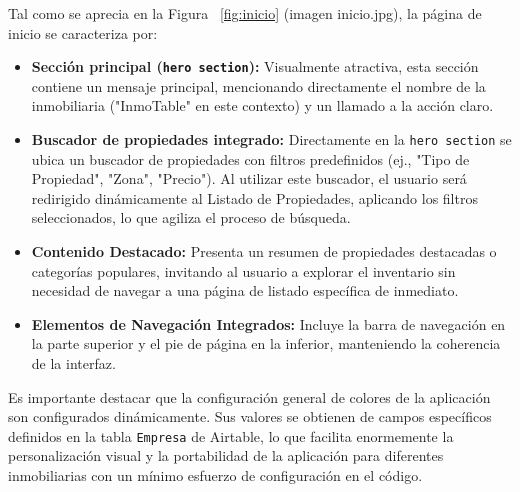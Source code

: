 \begin{enumerate}
    Tal como se aprecia en la Figura ~\ref{fig:inicio} (imagen inicio.jpg), la página de inicio se caracteriza por:

    \begin{itemize}
         \item \textbf{Sección principal (\texttt{hero section}):} Visualmente atractiva, esta sección contiene un mensaje principal, mencionando directamente el nombre de la inmobiliaria ("InmoTable" en este contexto) y un llamado a la acción claro.

         \item \textbf{Buscador de propiedades integrado:} Directamente en la \texttt{hero section} se ubica un buscador de propiedades con filtros predefinidos (ej., "Tipo de Propiedad", "Zona", "Precio"). Al utilizar este buscador, el usuario será redirigido dinámicamente al Listado de Propiedades, aplicando los filtros seleccionados, lo que agiliza el proceso de búsqueda.

         \item \textbf{Contenido Destacado:} Presenta un resumen de propiedades destacadas o categorías populares, invitando al usuario a explorar el inventario sin necesidad de navegar a una página de listado específica de inmediato.

         \item \textbf{Elementos de Navegación Integrados:} Incluye la barra de navegación en la parte superior y el pie de página en la inferior, manteniendo la coherencia de la interfaz.
    \end{itemize}

    Es importante destacar que la configuración general de colores de la aplicación son configurados dinámicamente. Sus valores se obtienen de campos específicos definidos en la tabla \texttt{Empresa} de Airtable, lo que facilita enormemente la personalización visual y la portabilidad de la aplicación para diferentes inmobiliarias con un mínimo esfuerzo de configuración en el código.


\end{enumerate}
